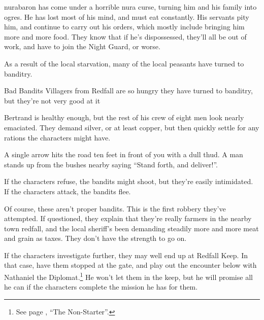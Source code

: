 \begin{multicols}{2}
\stopcontents[sq]

\resumecontents[Town]

\label{desperatemeasures}

\stopcontents[Town]

\startcontents[sq]

\sqminitoc

\gls{nurabaron} has come under a horrible nura curse, turning him and his family into ogres.
He has lost most of his mind, and must eat constantly.
His servants pity him, and continue to carry out his orders, which mostly include bringing him more and more food.  They know that if he's dispossessed, they'll all be out of work, and have to join the Night Guard, or worse.

As a result of the local starvation, many of the local peasants have turned to banditry.

{\N Bad Bandits}%
{Villagers from Redfall are so hungry they have turned to banditry, but they're not very good at it}%

Bertrand is healthy enough, but the rest of his crew of eight men look nearly emaciated.
They demand silver, or at least copper, but then quickly settle for any rations the characters might have.

\begin{boxtext}

	A single arrow hits the road ten feet in front of you with a dull thud.
	A man stands up from the bushes nearby saying ``Stand forth, and deliver!''.

\end{boxtext}

If the characters refuse, the bandits might shoot, but they're easily intimidated.  If the characters attack, the bandits flee.

Of course, these aren't proper bandits.
This is the first robbery they've attempted.
If questioned, they explain that they're really farmers in the nearby town \gls{redfall}, and the local sheriff's been demanding steadily more and more meat and grain as taxes.
They don't have the strength to go on.



If the characters investigate further, they may well end up at Redfall Keep.
In that case, have them stopped at the gate, and play out the encounter below with Nathaniel the Diplomat.\footnote{See page \pageref{nonstarter}, ``The Non-Starter''.}
He won't let them in the keep, but he will promise all he can if the characters complete the mission he has for them.


\end{multicols}
